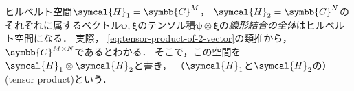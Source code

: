 \documentclass[
]{sotsu}
\newcommand{\bpsi}{\symbf{\psi}}
\newcommand{\bphi}{\symbf{\varphi}}
\newcommand{\bxi}{\symbf{\xi}}
\begin{document}
ヒルベルト空間$\symcal{H}_1 = \symbb{C}^M$，
$\symcal{H}_2 = \symbb{C}^N$のそれぞれに属するベクトル$\bpsi, \bxi$のテンソル積$\bpsi \otimes \bxi$の\emph{線形結合の全体}はヒルベルト空間になる．
実際，
\cref{eq:tensor-product-of-2-vector}の類推から，
$\symbb{C}^{M \times N}$であるとわかる．
そこで，この空間を$\symcal{H}_1 \otimes \symcal{H}_2$と書き，
（$\symcal{H}_1$と$\symcal{H}_2$の）(tensor product)という．



\end{document}
